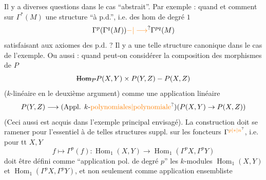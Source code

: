 Il y a diverses questions dans le cas
``abstrait''. Par exemple : quand
et comment   sur
$\Gamma^*(M)$ une structure ``à p.d.'',
i.e. des hom de degré $1$
\[
\Gamma^p(\Gamma^q(M))\unsure{-|\longrightarrow}\Gamma^{pq}(M)
\]
satisfaisant aux axiomes des p.d. ?
Il y a une telle structure
canonique dans le cas de l'exemple.
Ou aussi : quand peut-on considérer
la composition des morphismes de $P$
\[
\deleted{\operatorname{Hom}_P}P(X,Y)\times P(Y,Z)-P(X,Z)
\]
($k$-linéaire en le deuxième argument)
comme une application linéaire
\[
P(Y,Z)\longrightarrow(\text{Appl. $k$-\unsure{polynomiales|polynomiale}})(P(X,Y)\to P(X,Z))
\]
(Ceci aussi est acquis dans l'exemple principal envisagé). La
construction doit se ramener pour
l'essentiel à  de telles
structures suppl. sur les foncteurs $\Gamma^{\unsure{p|*|n}}$,
i.e. pour tt $X,Y$
\[
f\longmapsto\Gamma^p(f):\operatorname{Hom}_1(X,Y)\longrightarrow\operatorname{Hom}_1(\Gamma^p X,\Gamma^p Y)
\]
doit être défini comme ``application pol. de
degré $p$''  les $k$-modules
$\operatorname{Hom}_1(X,Y)$ et $\operatorname{Hom}_1(\Gamma^p X,\Gamma^p Y)$, et non
seulement comme application ensembliste
